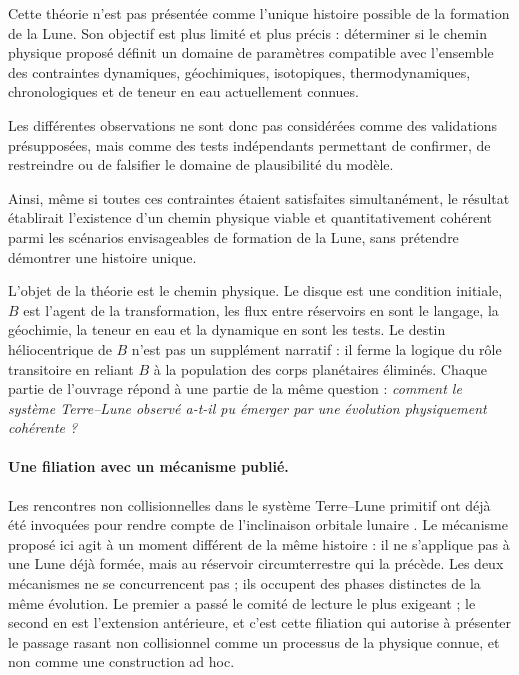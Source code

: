 \documentclass[11pt,a4paper,openany]{report}
\begin{document}
Cette théorie n'est pas présentée comme l'unique histoire possible de la formation de la Lune.
Son objectif est plus limité et plus précis : déterminer si le chemin physique proposé définit un
domaine de paramètres compatible avec l'ensemble des contraintes dynamiques, géochimiques,
isotopiques, thermodynamiques, chronologiques et de teneur en eau actuellement connues.

Les différentes observations ne sont donc pas considérées comme des validations présupposées,
mais comme des tests indépendants permettant de confirmer, de restreindre ou de falsifier le
domaine de plausibilité du modèle.

Ainsi, même si toutes ces contraintes étaient satisfaites simultanément, le résultat établirait
l'existence d'un chemin physique viable et quantitativement cohérent parmi les scénarios
envisageables de formation de la Lune, sans prétendre démontrer une histoire unique.

\begin{ideephys}
L'objet de la théorie est le chemin physique. Le disque est une condition initiale, $B$ est l'agent
de la transformation, les flux entre réservoirs en sont le langage, la géochimie, la teneur en eau
et la dynamique en sont les tests. Le destin héliocentrique de $B$ n'est pas un supplément
narratif : il ferme la logique du rôle transitoire en reliant $B$ à la population des corps
planétaires éliminés. Chaque partie de l'ouvrage répond à une partie de la même question :
\emph{comment le système Terre--Lune observé a-t-il pu émerger par une évolution
physiquement cohérente ?}
\end{ideephys}

\paragraph{Une filiation avec un mécanisme publié.}
Les rencontres non collisionnelles dans le système Terre--Lune primitif ont déjà été invoquées
pour rendre compte de l'inclinaison orbitale lunaire \cite{PahlevanMorbidelli2015}. Le mécanisme
proposé ici agit à un moment différent de la même histoire : il ne s'applique pas à une Lune déjà
formée, mais au réservoir circumterrestre qui la précède. Les deux mécanismes ne se concurrencent
pas ; ils occupent des phases distinctes de la même évolution. Le premier a passé le comité de
lecture le plus exigeant ; le second en est l'extension antérieure, et c'est cette filiation qui
autorise à présenter le passage rasant non collisionnel comme un processus de la physique connue,
et non comme une construction ad hoc.
\end{document}
